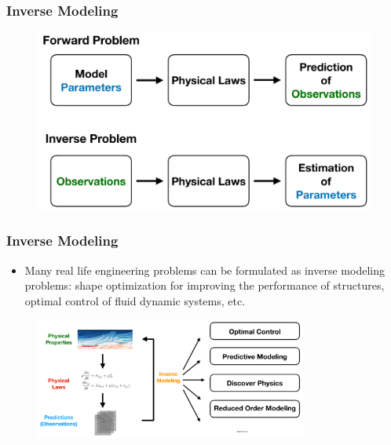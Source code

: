 \documentclass{beamer}
\begin{document}
\begin{frame}
	\frametitle{Inverse Modeling}
	\begin{figure}
	\centering
  \includegraphics[width=1.0\textwidth]{figures/inverse3}
\end{figure}
\end{frame}

\begin{frame}
	\frametitle{Inverse Modeling}
	\begin{itemize}
		\item Many real life engineering problems can be formulated as inverse modeling problems: shape optimization for improving the performance of structures, optimal control of fluid dynamic systems, etc.
	\end{itemize}
	\begin{figure}[hbt]
	\centering
  \includegraphics[width=0.8\textwidth]{figures/inverse2}
\end{figure}
\end{frame}
\end{document}
